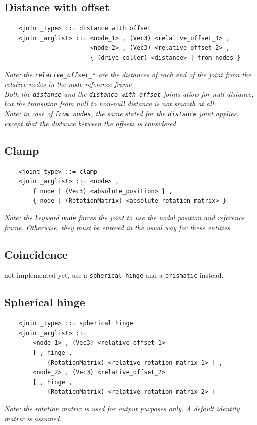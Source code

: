 \documentclass[10pt,dvips]{report}
\begin{document}
\subsection{Distance with offset}
\begin{verbatim}
    <joint_type> ::= distance with offset
    <joint_arglist> ::= <node_1> , (Vec3) <relative_offset_1> ,
                        <node_2> , (Vec3) <relative_offset_2> , 
                        { (drive_caller) <distance> | from nodes }
\end{verbatim}
{\em 
    Note: the {\tt relative\_offset\_*} are the distances of each end
    of the joint from the relative nodes in the node reference frame \\
    Both the {\tt distance} and the {\tt distance with offset} joints
    allow for null distance, but the transition from null to non-null
    distance is not smooth at all.
} \\
{\em
    Note: in case of {\tt from nodes}, the same stated for the {\tt distance}
    joint applies, except that the distance between the offsets is
    considered. 
}

\subsection{Clamp}
\begin{verbatim}
    <joint_type> ::= clamp 
    <joint_arglist> ::= <node> , 
        { node | (Vec3) <absolute_position> } ,
        { node | (RotationMatrix) <absolute_rotation_matrix> }
\end{verbatim}
{\em
    Note: the keyword {\tt node} forces the joint to use the nodal position
    and reference frame. Otherwise, they must be entered in the usual way
    for these entities
}

\subsection{Coincidence}
not implemented yet, use a {\tt spherical hinge} and a {\tt prismatic} 
instead.

\subsection{Spherical hinge}
\begin{verbatim}
    <joint_type> ::= spherical hinge
    <joint_arglist> ::= 
        <node_1> , (Vec3) <relative_offset_1> 
        [ , hinge , 
            (RotationMatrix) <relative_rotation_matrix_1> ] ,
        <node_2> , (Vec3) <relative_offset_2>
        [ , hinge , 
            (RotationMatrix) <relative_rotation_matrix_2> ]
\end{verbatim}
{\em
    Note: the rotation matrix is used for output purposes only. 
    A default identity matrix is assumed.
}
\end{document}
